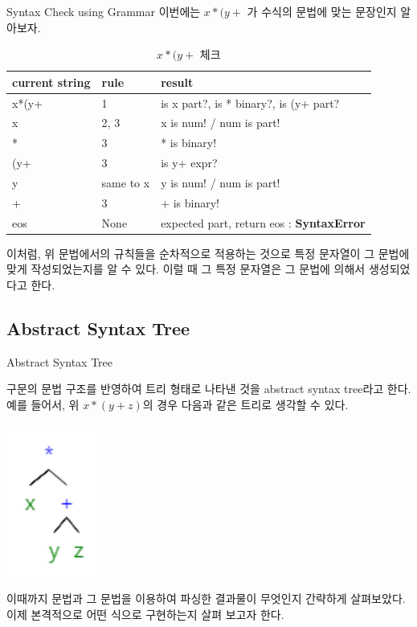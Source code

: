 \documentclass{beamer}
\begin{document}
\begin{frame}{Syntax Check using Grammar} 
이번에는 $x*(y+$ 가 수식의 문법에 맞는 문장인지 알아보자. 

\begin{table}[]
\centering
\caption{$x*(y+$ 체크}
\label{my-label}
\begin{tabular}{|l|l|l|}
\hline
current string & rule & result \\ \hline
x*(y+ & 1    & is x part?, is * binary?, is (y+ part?      \\ \hline
x &  2, 3 & x is num! / num is part!      \\ \hline
*& 3    & * is binary!      \\ \hline
(y+& 3    &  is y+ expr?      \\ \hline
y & same to x    &   y is num! / num is part!   \\ \hline
+ & 3    &  + is binary!     \\ \hline
eos &  None  &  expected part, return eos : \textbf{SyntaxError}     \\ \hline
\end{tabular}
\end{table}
이처럼, 위 문법에서의 규칙들을 순차적으로 적용하는 것으로 특정 문자열이 그 문법에 맞게 작성되었는지를 알 수 있다. 이럴 때 그 특정 문자열은 그 문법에 의해서 생성되었다고 한다. 

\end{frame}


\subsection{Abstract Syntax Tree} 

\begin{frame}{Abstract Syntax Tree} 

구문의 문법 구조를 반영하여 트리 형태로 나타낸 것을 abstract syntax tree라고 한다. 예를 들어서, 위 $x*(y+z)$의 경우 다음과 같은 트리로 생각할 수 있다. 

\includegraphics[height=5cm,keepaspectratio]{ast}

이때까지 문법과 그 문법을 이용하여 파싱한 결과물이 무엇인지 간략하게 살펴보았다. 이제 본격적으로 어떤 식으로 구현하는지 살펴 보고자 한다. 

\end{frame}
\end{document}
